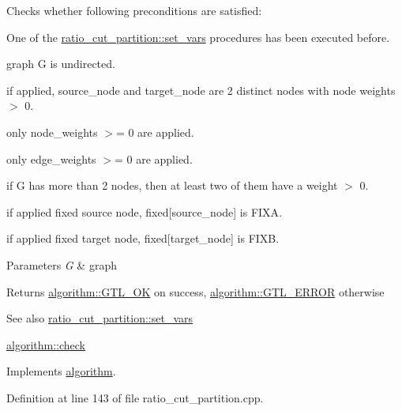 Checks whether following preconditions are satisfied\+: 
\begin{DoxyItemize}
\item One of the \mbox{\hyperlink{classratio__cut__partition_a4c143f82aac5fee3b955414ab7d6ce19}{ratio\+\_\+cut\+\_\+partition\+::set\+\_\+vars}} procedures has been executed before. 
\item graph {\ttfamily G} is undirected. 
\item if applied, {\ttfamily source\+\_\+node} and {\ttfamily target\+\_\+node } are 2 distinct nodes with node weights $>$ 0. 
\item only node\+\_\+weights $>$= 0 are applied. 
\item only edge\+\_\+weights $>$= 0 are applied. 
\item if {\ttfamily G} has more than 2 nodes, then at least two of them have a weight $>$ 0. 
\item if applied fixed source node, {\ttfamily fixed\mbox{[}source\+\_\+node\mbox{]} } is {\ttfamily F\+I\+XA}. 
\item if applied fixed target node, {\ttfamily fixed\mbox{[}target\+\_\+node\mbox{]} } is {\ttfamily F\+I\+XB}. 
\end{DoxyItemize}


\begin{DoxyParams}{Parameters}
{\em G} & graph \\
\hline
\end{DoxyParams}
\begin{DoxyReturn}{Returns}
{\ttfamily \mbox{\hyperlink{classalgorithm_af1a0078e153aa99c24f9bdf0d97f6710a5114c20e4a96a76b5de9f28bf15e282b}{algorithm\+::\+G\+T\+L\+\_\+\+OK}}} on success, {\ttfamily \mbox{\hyperlink{classalgorithm_af1a0078e153aa99c24f9bdf0d97f6710a6fcf574690bbd6cf710837a169510dd7}{algorithm\+::\+G\+T\+L\+\_\+\+E\+R\+R\+OR}}} otherwise 
\end{DoxyReturn}
\begin{DoxySeeAlso}{See also}
\mbox{\hyperlink{classratio__cut__partition_a4c143f82aac5fee3b955414ab7d6ce19}{ratio\+\_\+cut\+\_\+partition\+::set\+\_\+vars}} 

\mbox{\hyperlink{classalgorithm_a76361fb03ad1cf643affc51821e43bed}{algorithm\+::check}} 
\end{DoxySeeAlso}


Implements \mbox{\hyperlink{classalgorithm_a76361fb03ad1cf643affc51821e43bed}{algorithm}}.



Definition at line 143 of file ratio\+\_\+cut\+\_\+partition.\+cpp.


